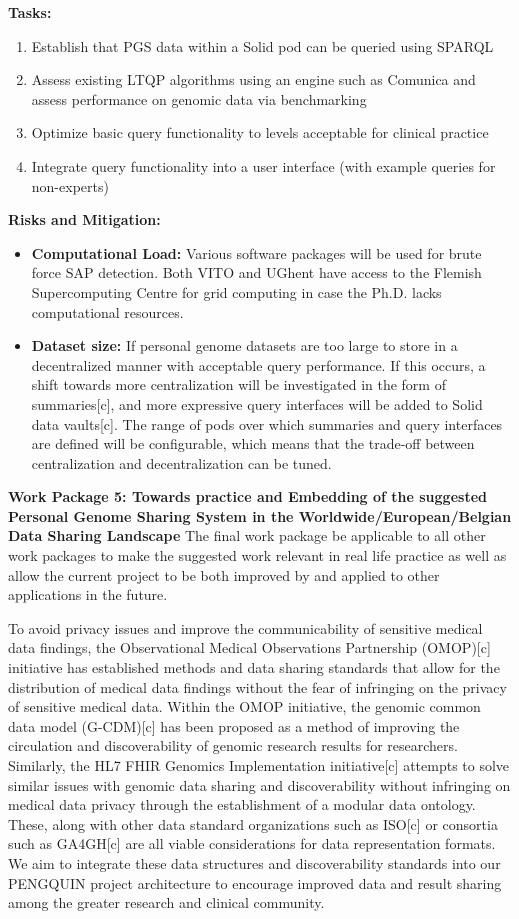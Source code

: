 \documentclass{article}
\begin{document}
\textbf{Tasks:} 
\begin{enumerate}
	\item Establish that PGS data within a Solid pod can be queried using SPARQL
	\item Assess existing LTQP algorithms using an engine such as Comunica and assess performance on genomic data via benchmarking
	\item Optimize basic query functionality to levels acceptable for clinical practice
	\item Integrate query functionality into a user interface (with example queries for non-experts)
\end{enumerate}

\textbf{Risks and Mitigation:} 
\begin{itemize}
	\item \textbf{Computational Load:} Various software packages will be used for brute force SAP detection. Both VITO and UGhent have access to the Flemish Supercomputing Centre for grid computing in case the Ph.D. lacks computational resources. 
	\item \textbf{Dataset size:} If personal genome datasets are too large to store in a decentralized manner with acceptable query performance. If this occurs, a shift towards more centralization will be investigated in the form of summaries[c], and more expressive query interfaces will be added to Solid data vaults[c]. The range of pods over which summaries and query interfaces are defined will be configurable, which means that the trade-off between centralization and decentralization can be tuned.
\end{itemize}


\textbf{Work Package 5: Towards practice and Embedding of the suggested Personal Genome Sharing System in the Worldwide/European/Belgian Data Sharing Landscape}
The final work package be applicable to all other work packages to make the suggested work relevant in real life practice as well as allow the current project to be both improved by and applied to other applications in the future.

To avoid privacy issues and improve the communicability of sensitive medical data findings, the Observational Medical Observations Partnership (OMOP)[c] initiative has established methods and data sharing standards that allow for the distribution of medical data findings without the fear of infringing on the privacy of sensitive medical data. Within the OMOP initiative, the genomic common data model (G-CDM)[c] has been proposed as a method of improving the circulation and discoverability of genomic research results for researchers. Similarly, the HL7 FHIR Genomics Implementation initiative[c] attempts to solve similar issues with genomic data sharing and discoverability without infringing on medical data privacy through the establishment of a modular data ontology. These, along with other data standard organizations such as ISO[c] or consortia such as GA4GH[c] are all viable considerations for data representation formats. We aim to integrate these data structures and discoverability standards into our PENGQUIN project architecture to encourage improved data and result sharing among the greater research and clinical community. 
\end{document}
